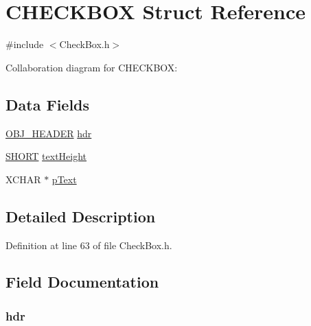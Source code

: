 \hypertarget{struct_c_h_e_c_k_b_o_x}{}\section{C\+H\+E\+C\+K\+B\+O\+X Struct Reference}
\label{struct_c_h_e_c_k_b_o_x}


{\ttfamily \#include $<$Check\+Box.\+h$>$}



Collaboration diagram for C\+H\+E\+C\+K\+B\+O\+X\+:
\subsection*{Data Fields}
\begin{DoxyCompactItemize}
\item 
\hyperlink{struct_o_b_j___h_e_a_d_e_r}{O\+B\+J\+\_\+\+H\+E\+A\+D\+E\+R} \hyperlink{struct_c_h_e_c_k_b_o_x_abeffaf353197a8a64fba6707b68ce0be}{hdr}
\item 
\hyperlink{_generic_type_defs_8h_ae9bb25d3afecf3bfab0fbe3c22c2050f}{S\+H\+O\+R\+T} \hyperlink{struct_c_h_e_c_k_b_o_x_a40fa9c35391b0005032180b85e7afd34}{text\+Height}
\item 
X\+C\+H\+A\+R $\ast$ \hyperlink{struct_c_h_e_c_k_b_o_x_a934b5563cdaf14803728ff3a7b7e8c7f}{p\+Text}
\end{DoxyCompactItemize}


\subsection{Detailed Description}


Definition at line 63 of file Check\+Box.\+h.



\subsection{Field Documentation}
\hypertarget{struct_c_h_e_c_k_b_o_x_abeffaf353197a8a64fba6707b68ce0be}{}
\subsubsection[{hdr}]{ hdr}\label{struct_c_h_e_c_k_b_o_x_abeffaf353197a8a64fba6707b68ce0be}


